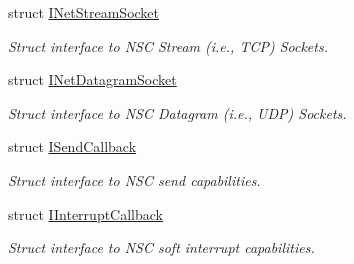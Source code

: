 \begin{DoxyCompactItemize}
struct \hyperlink{structINetStreamSocket}{I\+Net\+Stream\+Socket}
\begin{DoxyCompactList}\small\item\em Struct interface to N\+SC Stream (i.\+e., T\+CP) Sockets. \end{DoxyCompactList}\item 
struct \hyperlink{structINetDatagramSocket}{I\+Net\+Datagram\+Socket}
\begin{DoxyCompactList}\small\item\em Struct interface to N\+SC Datagram (i.\+e., U\+DP) Sockets. \end{DoxyCompactList}\item 
struct \hyperlink{structISendCallback}{I\+Send\+Callback}
\begin{DoxyCompactList}\small\item\em Struct interface to N\+SC send capabilities. \end{DoxyCompactList}\item 
struct \hyperlink{structIInterruptCallback}{I\+Interrupt\+Callback}
\begin{DoxyCompactList}\small\item\em Struct interface to N\+SC soft interrupt capabilities. \end{DoxyCompactList}\end{DoxyCompactItemize}
